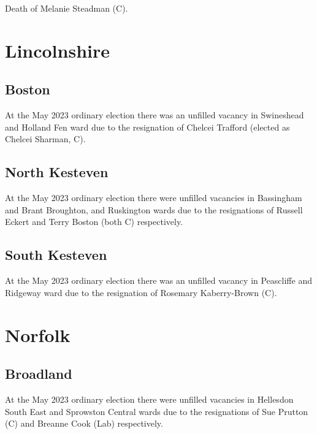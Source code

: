 \documentclass[a4paper,openany]{book}
\begin{document}
\begin{resultsiii}

Death of Melanie Steadman (C).

\section{Lincolnshire}

\subsection*{Boston}

At the May 2023 ordinary election there was an unfilled vacancy in Swineshead and Holland Fen ward due to the resignation of Chelcei Trafford (elected as Chelcei Sharman, C).%

\subsection*{North Kesteven}

At the May 2023 ordinary election there were unfilled vacancies in Bassingham and Brant Broughton, and Ruskington wards due to the resignations of Russell Eckert and Terry Boston (both C) respectively.%

\subsection*{South Kesteven}

At the May 2023 ordinary election there was an unfilled vacancy in Peascliffe and Ridgeway ward due to the resignation of Rosemary Kaberry-Brown (C).%

\section{Norfolk}

\subsection*{Broadland}

At the May 2023 ordinary election there were unfilled vacancies in Hellesdon South East and Sprowston Central wards due to the resignations of Sue Prutton (C) and Breanne Cook (Lab) respectively.%
%


\end{resultsiii}
\end{document}
